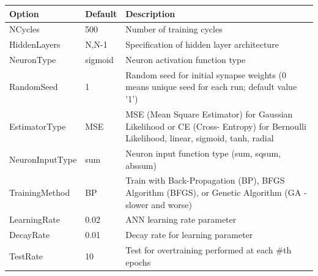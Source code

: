 \documentclass[11pt]{scrartcl}
\begin{document}
\begin{longtable}[c]{|p{4cm}|p{2.5cm}|p{7cm}|}

\hline
Option             & Default    & Description                                                                                                                                            \\ \hline
NCycles            & 500        & Number of training cycles                                                                                                                              \\ \hline
HiddenLayers       & N,N-1      & Specification of hidden layer architecture                                                                                                             \\ \hline
NeuronType         & sigmoid    & Neuron activation function type                                                                                                                        \\ \hline
RandomSeed         & 1          & Random seed for initial synapse weights (0 means unique seed for each run; default value ’1’)                                                          \\ \hline
EstimatorType      & MSE        & MSE (Mean Square Estimator) for Gaussian Likelihood or CE (Cross- Entropy) for Bernoulli Likelihood, linear, sigmoid, tanh, radial                     \\ \hline
NeuronInputType    & sum        & Neuron input function type (sum, sqsum, abssum)                                                                                                        \\ \hline
TrainingMethod     & BP         & Train with Back-Propagation (BP), BFGS Algorithm (BFGS), or Genetic Algorithm (GA - slower and worse)                                                  \\ \hline
LearningRate       & 0.02       & ANN learning rate parameter                                                                                                                            \\ \hline
DecayRate          & 0.01       & Decay rate for learning parameter                                                                                                                      \\ \hline
TestRate           & 10         & Test for overtraining performed at each \#th epochs                                                                                                    \\ \hline

\end{longtable}
\end{document}
